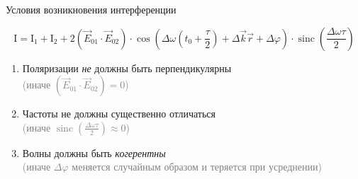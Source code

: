 \documentclass[usenames,dvipsnames,pdftex,unicode,hidelinks]{beamer}
\newcommand{\I}{\mathrm{I}} %
\newcommand{\muted}[1]{\textcolor{gray}{#1}}
\newcommand{\vect}[1]{\vec{#1}} %
\renewcommand{\phi}{\varphi} %
\begin{document}
  \begin{frame}{Условия возникновения интерференции}

    { \small
    \[
      \boxed{
        \I = \I_1 + \I_2 + 2(\vect{E}_{01} \cdot \vect{E}_{02}) \cdot\cos \left( \Delta\omega (t_0+\frac{\tau}{2})+\Delta
        \vect{k}\vect{r}+\Delta\phi \right) \cdot \operatorname{sinc}(\frac{\Delta\omega\tau}{2})
      }
    \]
    }
    \begin{enumerate}[<+->]
      \item Поляризации \emph{не} должны быть перпендикулярны\\
        \muted{(иначе $(\vect{E}_{01} \cdot \vect{E}_{02}) = 0$)}
        \vspace{5mm}
      \item Частоты не должны существенно отличаться\\
        \muted{(иначе $\operatorname{sinc}(\frac{\Delta\omega\tau}{2}) \approx 0$)}
        \vspace{5mm}
      \item Волны должны быть \emph{когерентны}\\
        \muted{(иначе $\Delta\phi$ меняется случайным образом и теряется при усреднении)}
    \end{enumerate}

  \end{frame}
\end{document}
